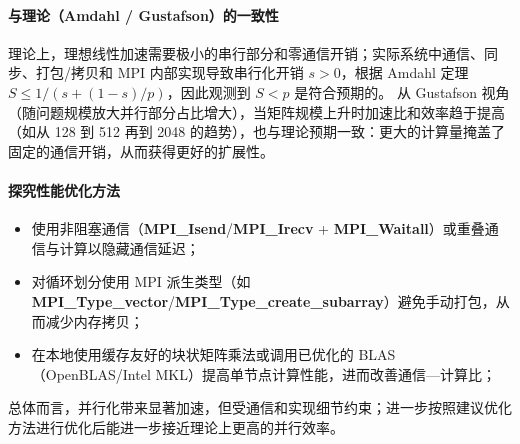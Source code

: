 \documentclass{SYSUReport}
\begin{document}
\paragraph{与理论（Amdahl / Gustafson）的一致性}
理论上，理想线性加速需要极小的串行部分和零通信开销；实际系统中通信、同步、打包/拷贝和 MPI 内部实现导致串行化开销 $s>0$，根据 Amdahl 定理 $S \le 1/(s+(1-s)/p)$，因此观测到 $S<p$ 是符合预期的。
从 Gustafson 视角（随问题规模放大并行部分占比增大），当矩阵规模上升时加速比和效率趋于提高（如从 128 到 512 再到 2048 的趋势），也与理论预期一致：更大的计算量掩盖了固定的通信开销，从而获得更好的扩展性。

\paragraph{探究性能优化方法}
\begin{itemize}
    \item 使用非阻塞通信（\textbf{MPI\_Isend}/\textbf{MPI\_Irecv} + \textbf{MPI\_Waitall}）或重叠通信与计算以隐藏通信延迟；
    \item 对循环划分使用 MPI 派生类型（如 \textbf{MPI\_Type\_vector}/\textbf{MPI\_Type\_create\_subarray}）避免手动打包，从而减少内存拷贝；
    \item 在本地使用缓存友好的块状矩阵乘法或调用已优化的 BLAS（OpenBLAS/Intel MKL）提高单节点计算性能，进而改善通信—计算比；
\end{itemize}

总体而言，并行化带来显著加速，但受通信和实现细节约束；进一步按照建议优化方法进行优化后能进一步接近理论上更高的并行效率。
\end{document}
